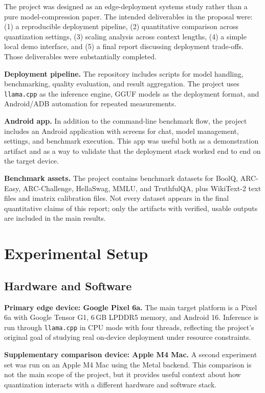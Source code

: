 \documentclass{article}
\begin{document}
The project was designed as an edge-deployment systems study rather than a pure model-compression paper. The intended deliverables in the proposal were: (1) a reproducible deployment pipeline, (2) quantitative comparison across quantization settings, (3) scaling analysis across context lengths, (4) a simple local demo interface, and (5) a final report discussing deployment trade-offs. Those deliverables were substantially completed.

\textbf{Deployment pipeline.} The repository includes scripts for model handling, benchmarking, quality evaluation, and result aggregation. The project uses \texttt{llama.cpp} as the inference engine, GGUF models as the deployment format, and Android/ADB automation for repeated measurements.

\textbf{Android app.} In addition to the command-line benchmark flow, the project includes an Android application with screens for chat, model management, settings, and benchmark execution. This app was useful both as a demonstration artifact and as a way to validate that the deployment stack worked end to end on the target device.

\textbf{Benchmark assets.} The project contains benchmark datasets for BoolQ, ARC-Easy, ARC-Challenge, HellaSwag, MMLU, and TruthfulQA, plus WikiText-2 text files and imatrix calibration files. Not every dataset appears in the final quantitative claims of this report; only the artifacts with verified, usable outputs are included in the main results.

\section{Experimental Setup}
\label{sec:setup}

\subsection{Hardware and Software}

\textbf{Primary edge device: Google Pixel 6a.} The main target platform is a Pixel 6a with Google Tensor G1, 6\,GB LPDDR5 memory, and Android 16. Inference is run through \texttt{llama.cpp} in CPU mode with four threads, reflecting the project's original goal of studying real on-device deployment under resource constraints.

\textbf{Supplementary comparison device: Apple M4 Mac.} A second experiment set was run on an Apple M4 Mac using the Metal backend. This comparison is not the main scope of the project, but it provides useful context about how quantization interacts with a different hardware and software stack.
\end{document}
